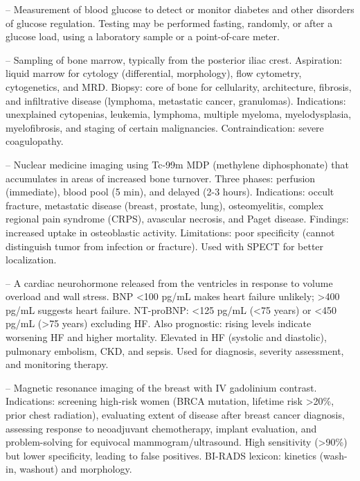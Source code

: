 -- Measurement of blood glucose to detect or monitor diabetes and other disorders of glucose regulation. Testing may be performed fasting, randomly, or after a glucose load, using a laboratory sample or a point-of-care meter.

-- Sampling of bone marrow, typically from the posterior iliac crest. Aspiration: liquid marrow for cytology (differential, morphology), flow cytometry, cytogenetics, and MRD. Biopsy: core of bone for cellularity, architecture, fibrosis, and infiltrative disease (lymphoma, metastatic cancer, granulomas). Indications: unexplained cytopenias, leukemia, lymphoma, multiple myeloma, myelodysplasia, myelofibrosis, and staging of certain malignancies. Contraindication: severe coagulopathy.

-- Nuclear medicine imaging using Tc-99m MDP (methylene diphosphonate) that accumulates in areas of increased bone turnover. Three phases: perfusion (immediate), blood pool (5 min), and delayed (2-3 hours). Indications: occult fracture, metastatic disease (breast, prostate, lung), osteomyelitis, complex regional pain syndrome (CRPS), avascular necrosis, and Paget disease. Findings: increased uptake in osteoblastic activity. Limitations: poor specificity (cannot distinguish tumor from infection or fracture). Used with SPECT for better localization.

-- A cardiac neurohormone released from the ventricles in response to volume overload and wall stress. BNP <100 pg/mL makes heart failure unlikely; >400 pg/mL suggests heart failure. NT-proBNP: <125 pg/mL (<75 years) or <450 pg/mL (>75 years) excluding HF. Also prognostic: rising levels indicate worsening HF and higher mortality. Elevated in HF (systolic and diastolic), pulmonary embolism, CKD, and sepsis. Used for diagnosis, severity assessment, and monitoring therapy.

-- Magnetic resonance imaging of the breast with IV gadolinium contrast. Indications: screening high-risk women (BRCA mutation, lifetime risk >20\%, prior chest radiation), evaluating extent of disease after breast cancer diagnosis, assessing response to neoadjuvant chemotherapy, implant evaluation, and problem-solving for equivocal mammogram/ultrasound. High sensitivity (>90\%) but lower specificity, leading to false positives. BI-RADS lexicon: kinetics (wash-in, washout) and morphology.

